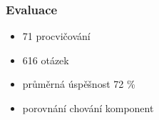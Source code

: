 \documentclass[xcolor=svgnames]{beamer}
\begin{document}






\begin{frame}
\frametitle{Evaluace}

\begin{itemize}
\item 71 procvičování
\item 616 otázek
\item průměrná úspěšnost 72 \%
\item porovnání chování komponent
\end{itemize}

\end{frame}
\end{document}
